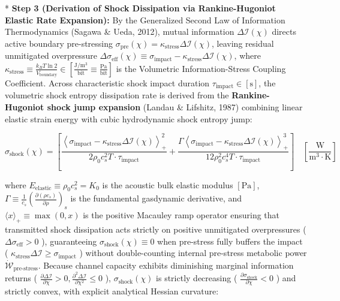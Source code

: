 \documentclass[11pt,a4paper]{article}
\theoremstyle{definition}\newtheorem{definition}{Definition}
\theoremstyle{remark}\newtheorem{remark}{Remark}
\begin{document}
* \textbf{Step 3 (Derivation of Shock Dissipation via Rankine-Hugoniot Elastic Rate Expansion):}
By the Generalized Second Law of Information Thermodynamics (Sagawa \& Ueda, 2012), mutual information $\Delta \mathcal{I}(\chi)$ directs active boundary pre-stressing $\sigma_{\text{pre}}(\chi) = \kappa_{\text{stress}} \Delta \mathcal{I}(\chi)$, leaving residual unmitigated overpressure $\Delta \sigma_{\text{eff}}(\chi) \equiv \sigma_{\text{impact}} - \kappa_{\text{stress}} \Delta \mathcal{I}(\chi)$, where $\kappa_{\text{stress}} \equiv \frac{k_B T \ln 2}{V_{\text{boundary}}} \in [\frac{\mathrm{J/m^3}}{\mathrm{bit}} \equiv \frac{\mathrm{Pa}}{\mathrm{bit}}]$ is the Volumetric Information-Stress Coupling Coefficient. Across characteristic shock impact duration $\tau_{\text{impact}} \in [\mathrm{s}]$, the volumetric shock entropy dissipation rate is derived from the \textbf{Rankine-Hugoniot shock jump expansion} (Landau \& Lifshitz, 1987) combining linear elastic strain energy with cubic hydrodynamic shock entropy jump:


\begin{equation}
\boxed{\sigma_{\text{shock}}(\chi) = [ \frac{\left\langle \sigma_{\text{impact}} - \kappa_{\text{stress}} \Delta \mathcal{I}(\chi) \right\rangle_+^2}{2 \rho_0 c_s^2 T \cdot \tau_{\text{impact}}} + \frac{\Gamma \left\langle \sigma_{\text{impact}} - \kappa_{\text{stress}} \Delta \mathcal{I}(\chi) \right\rangle_+^3}{12 \rho_0^2 c_s^4 T \cdot \tau_{\text{impact}}} ] \quad [\frac{\mathrm{W}}{\mathrm{m^3 \cdot K}}]}
\end{equation}


where $E_{\text{elastic}} \equiv \rho_0 c_s^2 = K_0$ is the acoustic bulk elastic modulus $[\mathrm{Pa}]$, $\Gamma \equiv \frac{1}{c_s} \left( \frac{\partial(\rho c_s)}{\partial \rho} \right)_s$ is the fundamental gasdynamic derivative, and $\langle x \rangle_+ \equiv \max(0, x)$ is the positive Macauley ramp operator ensuring that transmitted shock dissipation acts strictly on positive unmitigated overpressures ( $\Delta \sigma_{\text{eff}} > 0$ ), guaranteeing $\sigma_{\text{shock}}(\chi) \equiv 0$ when pre-stress fully buffers the impact ( $\kappa_{\text{stress}}\Delta\mathcal{I} \ge \sigma_{\text{impact}}$ ) without double-counting internal pre-stress metabolic power $\dot{\mathcal{W}}_{\text{pre-stress}}$.
Because channel capacity exhibits diminishing marginal information returns ( $\frac{\partial \Delta \mathcal{I}}{\partial \chi} > 0, \frac{\partial^2 \Delta \mathcal{I}}{\partial \chi^2} \le 0$ ), $\sigma_{\text{shock}}(\chi)$ is strictly decreasing ( $\frac{\partial \sigma_{\text{shock}}}{\partial \chi} < 0$ ) and strictly convex, with explicit analytical Hessian curvature:
\end{document}

